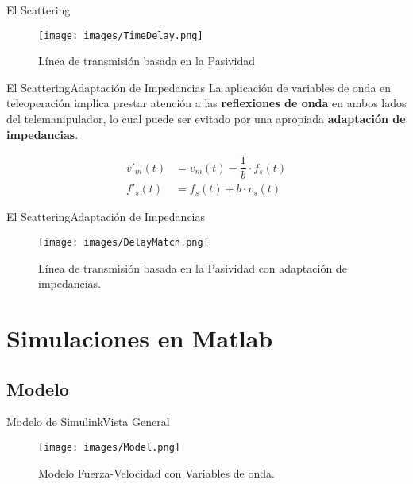 \documentclass{beamer}
\begin{document}
\begin{frame}{El Scattering}{}
	
	\begin{figure}[h!]
		\centering
		\texttt{[image: images/TimeDelay.png]}
		\caption{Línea de transmisión basada en la Pasividad}
		\label{DELAY}
	\end{figure}
	
\end{frame}

\begin{frame}{El Scattering}{Adaptación de Impedancias}
	La aplicación de variables de onda en teleoperación implica prestar atención a las \textbf{reflexiones de onda} en ambos lados del telemanipulador, lo cual puede ser evitado por una apropiada \textbf{adaptación de impedancias}.
	
	\begin{equation}
		\begin{split}
		v'_m(t) &= v_m(t)-\dfrac{1}{b}\cdot f_s(t)\\
		f'_s(t) &= f_s(t) + b \cdot v_s(t)
		\end{split}
	\end{equation}
\end{frame}

\begin{frame}{El Scattering}{Adaptación de Impedancias}
	
	\begin{figure}[h!]
		\centering
		\texttt{[image: images/DelayMatch.png]}
		\caption{Línea de transmisión basada en la Pasividad con adaptación de impedancias.}
		\label{DELAYMATCH}
	\end{figure}
	
\end{frame}

\section{Simulaciones en Matlab}

\subsection{Modelo}

\begin{frame}{Modelo de Simulink}{Vista General}
	
	\begin{figure}[h!]
		\centering
		\texttt{[image: images/Model.png]}
		\caption{Modelo Fuerza-Velocidad con Variables de onda.}
		\label{Model}
	\end{figure}
\end{frame}
\end{document}
